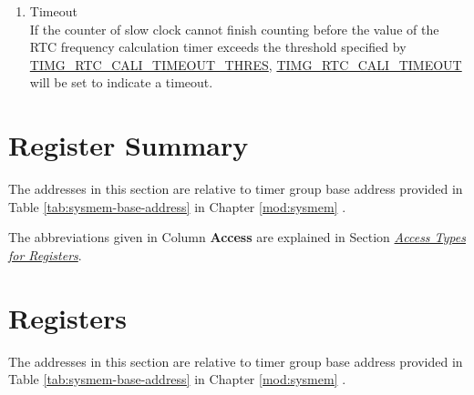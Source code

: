 \documentclass[main\_\_EN.tex]{subfiles}
\begin{document}
\begin{enumerate}
\begin{itemize}
        \item Select periodic frequency calculation by enabling \hyperref[fielddesc:TIMGRTCCALISTARTCYCLING]{TIMG\_RTC\_CALI\_START\_CYCLING}. The hardware then performs frequency calculation continuously.

        \item When \hyperref[fielddesc:TIMGRTCCALICYCLINGDATAVLD]{TIMG\_RTC\_CALI\_CYCLING\_DATA\_VLD} is 1, \hyperref[fielddesc:TIMGRTCCALIVALUE]{TIMG\_RTC\_CALI\_VALUE} is valid.
    \end{itemize}
    \item Timeout\\
    If the counter of slow clock cannot finish counting before the value of the RTC frequency calculation timer exceeds the threshold specified by \hyperref[fielddesc:TIMGRTCCALITIMEOUTTHRES]{TIMG\_RTC\_CALI\_TIMEOUT\_THRES}, \hyperref[fielddesc:TIMGRTCCALITIMEOUT]{TIMG\_RTC\_CALI\_TIMEOUT} will be set to indicate a timeout.
\end{enumerate}





\newpage
\hypertarget{timg-reg-summ}{}
\section{Register Summary}
\label{sec:timg-reg-summ}

The addresses in this section are relative to timer group base address provided in Table \ref{tab:sysmem-base-address} \textit{} in Chapter \ref{mod:sysmem} \textit{}.

The abbreviations given in Column \textbf{Access} are explained in Section \hyperref[glossary-access-types]{\textit{Access Types for Registers}}.






\newpage
\section{Registers}

The addresses in this section are relative to timer group base address provided in Table \ref{tab:sysmem-base-address} \textit{} in Chapter \ref{mod:sysmem} \textit{}.


\end{document}
